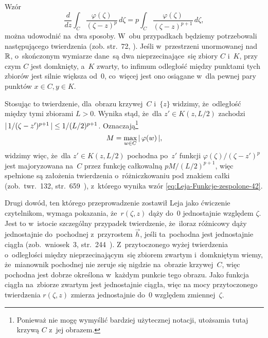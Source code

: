 \documentclass[a4paper,11pt]{article}
\begin{document}
\vspace{\spaceFour}





\noindent
{} Wzór
\begin{equation}
  \label{eq:Leja-Funkcje-zespolone-41}
  \frac{ d }{ dz } \int_{ C } \frac{ \varphi( \zeta ) }{ ( \zeta - z )^{ p } } \, d\zeta =
  p \int_{ C } \frac{ \varphi( \zeta ) }{ ( \zeta - z )^{ p + 1 } } \, d\zeta,
\end{equation}
można udowodnić na~dwa sposoby. W~obu przypadkach będziemy
potrzebowali następującego twierdzenia (zob. str.~72,
\cite{SchwartzKursAnalizyMatematycznejVolI1979}). Jeśli w~przestrzeni
unormowanej nad~$\mathbb{R}$, o~skończonym wymiarze dane~są dwa
nieprzecinające~się zbiory $C$ i~$K$, przy czym $C$ jest domknięty,
a~$K$ zwarty, to infimum odległość między punktami tych zbiorów jest
silnie większa od~$0$, co~więcej jest ono osiągane w~dla pewnej pary
punktów $x \in C, y \in K$.

Stosując to twierdzenie, dla~obrazu krzywej~$C$ i~$\{ z \}$ widzimy,
że~odległość między tymi zbiorami $L > 0$. Wynika stąd, że~dla
$z' \in K( z, L / 2 )$ zachodzi
$|\, {  1 / ( \zeta - z' )^{ p + 1 }  } \,| \leq 1 / ( L / 2 )^{ p + 1 }$.
Oznaczają\footnote{Ponieważ nie mogę wymyślić bardziej użytecznej
  notacji, utożsamia tutaj krzywą $C$ z~jej obrazem.}
\begin{equation}
  \label{eq:Leja-Funkcje-zespolone-42}
  M = \max_{ w \in C } |\, {  \varphi( w )  } \,|,
\end{equation}
widzimy więc, że~dla $z' \in K( z, L / 2 )$ pochodna po~$z'$ funkcji
$\varphi( \zeta ) / ( \zeta - z' )^{ p }$ jest majoryzowana na~$C$
przez funkcję całkowalną $p M / ( L / 2 )^{ p + 1 }$, więc spełnione
są założenia twierdzenia o~różniczkowaniu pod znakiem całki
(zob.~twr.~132,
str.~659~\cite{SchwartzKursAnalizyMatematycznejVolI1979}), z~którego
wynika wzór \eqref{eq:Leja-Funkcje-zespolone-42}.

Drugi dowód, ten którego przeprowadzenie zostawił Leja jako ćwiczenie
czytelnikom, wymaga pokazania, że~$r( \zeta, z )$ dąży do~$0$
jednostajnie względem $\zeta$. Jest to w~istocie szczególny przypadek
twierdzenie, że~iloraz różnicowy dąży jednostajnie do~pochodnej
z~przyrostem $\vec{ h }$, jeśli ta~pochodna jest jednostajnie ciągła
(zob.~wniosek~3,
str.~244~\cite{SchwartzKursAnalizyMatematycznejVolI1979}).
Z~przytoczonego wyżej twierdzenia o~odległości między
nieprzecinającym~się zbiorem zwartym i~domkniętym wiemy, że~mianownik
pochodnej nie zeruje się nigdzie na~obrazie krzywej~$C$, więc pochodna
jest dobrze określona w~każdym punkcie tego obrazu. Jako funkcja
ciągła na~zbiorze zwartym jest jednostajnie ciągła, więc na mocy
przytoczonego twierdzenia $r( \zeta, z )$ zmierza jednostajnie do~$0$
względem zmiennej~$\zeta$.
\end{document}
